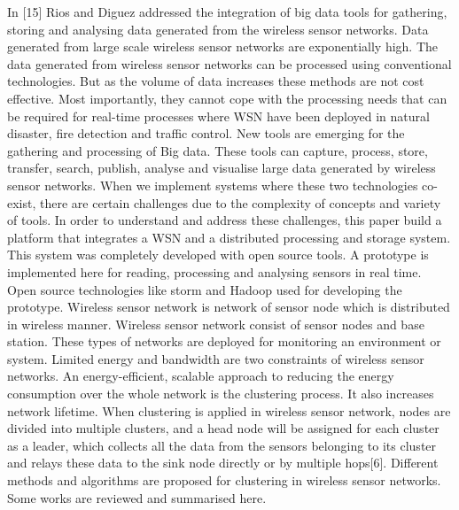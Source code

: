 \documentclass[MTech]{iitmdiss}
\begin{document}
In [15] Rios and Diguez addressed  the integration of big data tools for gathering, storing and analysing data generated from the wireless sensor networks. Data  generated from large scale wireless sensor networks are exponentially high. The data generated from wireless sensor networks can be processed using conventional technologies. But as the volume of data increases these methods are not cost effective. Most importantly, they cannot cope with the processing needs that can be required for real-time processes where WSN have been deployed in natural disaster, fire detection and traffic control. New tools are emerging for  the gathering and processing of Big data. These tools can capture, process, store, transfer, search, publish, analyse and visualise large data generated by wireless sensor networks. When we implement systems where these two technologies co-exist, there are certain challenges due to the complexity of concepts and variety of tools. In order to  understand and address  these challenges, this paper   build a platform that integrates a WSN and a distributed processing and storage system. This system was completely developed with open source tools. A prototype is implemented here for reading, processing and analysing sensors in real time. Open source technologies like storm and Hadoop used for developing the prototype.
\newpage
Wireless sensor network  is network of sensor node which is distributed in wireless manner. Wireless sensor network consist of sensor nodes and base station. These types of networks are  deployed for monitoring an environment or system. Limited energy and bandwidth are two constraints of wireless sensor networks. An energy-efficient, scalable approach to reducing the energy consumption over the whole network is the clustering process. It also increases network lifetime. When clustering is applied in wireless sensor network, nodes are divided into multiple clusters, and a head node will be assigned for each cluster as a leader, which collects all the data from the sensors belonging to its cluster and relays these data to the sink node directly or by multiple hops[6]. Different methods and algorithms are proposed for clustering in wireless sensor networks. Some works are reviewed and summarised here.
\end{document}
